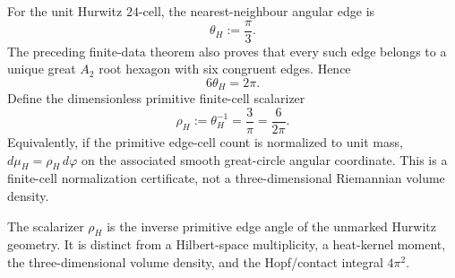 \documentclass[11pt]{article}
\begin{document}
\begin{definition}
\label{p1:def:primitive-hurwitz-cell-scalarizer}
For the unit Hurwitz \(24\)-cell, the nearest-neighbour angular edge is
\[
 \boxed{\theta_H:=\frac{\pi}{3}.}
\]
The preceding finite-data theorem also proves that every such edge belongs to
a unique great \(A_2\) root hexagon with six congruent edges.  Hence
\[
 \boxed{6\theta_H=2\pi.}
\]
Define the dimensionless primitive finite-cell scalarizer
\[
 \boxed{\rho_H:=\theta_H^{-1}=\frac3\pi=\frac6{2\pi}.}
\]
Equivalently, if the primitive edge-cell count is normalized to unit mass,
\(d\mu_H=\rho_H\,d\varphi\) on the associated smooth great-circle angular
coordinate.  This is a finite-cell normalization certificate, not a
three-dimensional Riemannian volume density.
\end{definition}

\begin{remark}
\label{p1:rem:primitive-hurwitz-cell-scalarizer-scope}
The scalarizer \(\rho_H\) is the inverse primitive edge angle of the
unmarked Hurwitz geometry.  It is distinct from a Hilbert-space
multiplicity, a heat-kernel moment, the three-dimensional volume density,
and the Hopf/contact integral \(4\pi^2\).
\end{remark}
\end{document}
